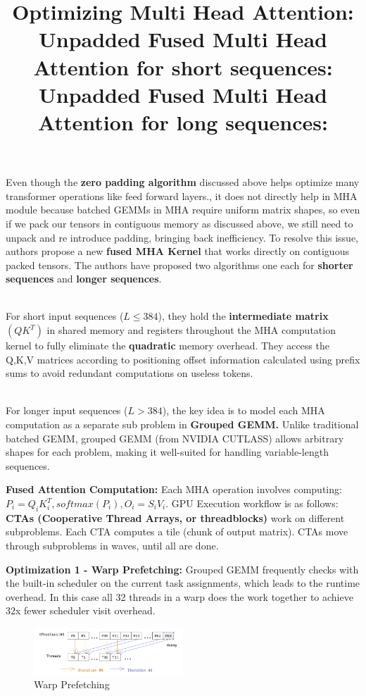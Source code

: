 \documentclass{article}
\begin{document}
\title{\textbf{Optimizing Multi Head Attention: }} Even though the \textbf{zero padding algorithm} discussed above helps optimize many transformer operations like feed forward layers., it does not directly help in MHA module because batched GEMMs in MHA require uniform matrix shapes, so even if we pack our tensors in contiguous memory as discussed above, we still need to unpack and re introduce padding, bringing back inefficiency. To resolve this issue, authors propose a new \textbf{fused MHA Kernel} that works directly on contiguous packed tensors. The authors have proposed two algorithms one each for \textbf{shorter sequences} and \textbf{longer sequences}. \\ \\
\title{\textbf{Unpadded Fused Multi Head Attention for short sequences: }} For short input sequences ($L \leq 384$), they hold the \textbf{intermediate matrix} $(QK^T)$ in shared memory and registers throughout the MHA computation kernel to fully eliminate the \textbf{quadratic} memory overhead. They access the Q,K,V matrices according to positioning offset information calculated using prefix sums to avoid redundant computations on useless tokens. \\ \\
\title{\textbf{Unpadded Fused Multi Head Attention for long sequences: }} For longer input sequences ($L > 384$), the key idea is to model each MHA computation as a separate sub problem in \textbf{Grouped GEMM.} Unlike traditional batched GEMM, grouped GEMM (from NVIDIA CUTLASS) allows arbitrary shapes for each problem, making it well-suited for handling variable-length sequences.

\textbf{Fused Attention Computation: } Each MHA operation involves computing: $P_i = Q_iK_i^T, softmax(P_i), O_i = S_iV_i$. GPU Execution workflow is as follows: \textbf{CTAs (Cooperative Thread Arrays, or threadblocks)} work on different subproblems. Each CTA computes a tile (chunk of output matrix). CTAs move through subproblems in waves, until all are done. 

\textbf{Optimization 1 - Warp Prefetching: }Grouped GEMM frequently checks with the built-in scheduler on the current task assignments, which leads to the runtime overhead. In this case all 32 threads in a warp does the work together to achieve 32x fewer scheduler visit overhead.

\begin{figure}[h]
    \centering
    \includegraphics[width=0.5\textwidth]{prefetch.png}
    \caption{Warp Prefetching}
    \label{fig:warp_prefetching}
    \vspace{-0.5cm}
\end{figure}
\end{document}
